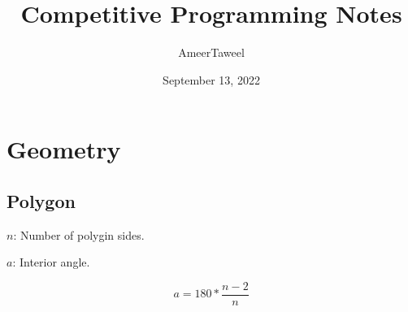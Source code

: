 \documentclass[12pt, a4paper]{article}
\title{Competitive Programming Notes}
\author{AmeerTaweel}
\date{September 13, 2022}
\begin{document}
\maketitle

\newpage

\tableofcontents

\newpage

\section{Geometry}

\subsection{Polygon}

$n$: Number of polygin sides.

$a$: Interior angle.

\begin{displaymath}
	a = 180 * \frac{n - 2}{n}
\end{displaymath}
\end{document}
